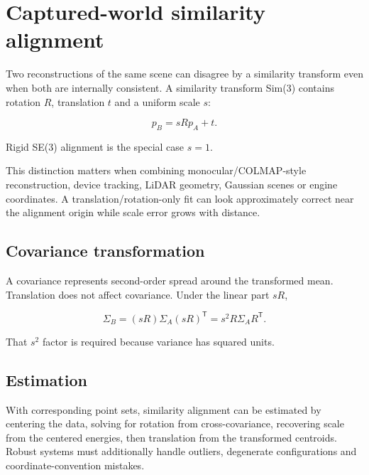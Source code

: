 \hypertarget{appendix-5f40b4fea463}{}\label{referencestart:appendix-5f40b4fea463}
\section{Captured-world similarity alignment}\label{appendix-5f40b4fea463-captured-world-similarity-alignment}

\hypertarget{appendix-5f40b4fea463-captured-world-similarity-alignment}{}

Two reconstructions of the same scene can disagree by a similarity transform even when both are internally consistent. A similarity transform Sim(3) contains rotation \(R\), translation \(t\) and a uniform scale \(s\):

\[
p_B = sRp_A+t.
\]

Rigid SE(3) alignment is the special case \(s=1\).

This distinction matters when combining monocular/COLMAP-style reconstruction, device tracking, LiDAR geometry, Gaussian scenes or engine coordinates. A translation/rotation-only fit can look approximately correct near the alignment origin while scale error grows with distance.

\subsection{Covariance transformation}\label{appendix-5f40b4fea463-covariance-transformation}

\hypertarget{appendix-5f40b4fea463-covariance-transformation}{}

A covariance represents second-order spread around the transformed mean. Translation does not affect covariance. Under the linear part \(sR\),

\[
\Sigma_B
=
(sR)\Sigma_A(sR)^{\mathsf T}
=
s^2 R\Sigma_A R^{\mathsf T}.
\]

That \(s^2\) factor is required because variance has squared units.

\subsection{Estimation}\label{appendix-5f40b4fea463-estimation}

\hypertarget{appendix-5f40b4fea463-estimation}{}

With corresponding point sets, similarity alignment can be estimated by centering the data, solving for rotation from cross-covariance, recovering scale from the centered energies, then translation from the transformed centroids. Robust systems must additionally handle outliers, degenerate configurations and coordinate-convention mistakes.

